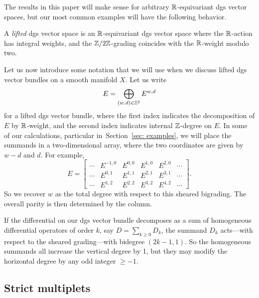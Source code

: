 \documentclass[pdftex]{sigma}
\numberwithin{equation}{section}
\begin{document}
The results in this paper will make sense for arbitrary $\mathbb R$-equivariant dgs vector spaces, but our most common examples will have the following behavior.

\begin{dfn}
	A \emph{lifted} dgs vector space is an $\mathbb R$-equivariant dgs vector space where the $\mathbb R$-action has integral weights, and the $\mathbb Z/2\mathbb Z$-grading coincides with the $\mathbb R$-weight modulo two.
\end{dfn}

Let us now introduce some notation that we will use when we discuss lifted dgs vector bundles on a smooth manifold $X$. Let us write
\begin{equation*}
E = \bigoplus_{(w,d) \in \mathbb Z^2} E^{w,d}
\end{equation*}
for a lifted dgs vector bundle, where the first index indicates the decomposition of $E$ by $\mathbb R$-weight, and the second index indicates internal $\mathbb Z$-degree on $E$. In some of our calculations, particular in~Section~\ref{sec: examples}, we will place the summands in a two-dimensional array, where the two coordinates are given by $w-d$ and $d$. For example,
\begin{equation*}
E =
\begin{bmatrix}
\cdots &E^{-1,0} &E^{0,0} &E^{1,0} &E^{2,0}&\cdots\\
\cdots &E^{0,1} &E^{1,1} &E^{2,1} &E^{3,1}&\cdots\\
\cdots &E^{1,2} &E^{2,2} &E^{3,2} &E^{4,2} &\cdots
\end{bmatrix}.
\end{equation*}
So we recover $w$ as the total degree with respect to this sheared bigrading. The overall parity is then determined by the column.

If the differential on our dgs vector bundle decomposes as a sum of homogeneous differential operators of order $k$, say $D = \sum_{k \ge 0} D_k$, the summand $D_k$ acts---with respect to the sheared grading---with bidegree $(2k-1, 1)$. So the homogeneous summands all increase the vertical degree by 1, but they may modify the horizontal degree by any odd integer $\ge -1$.

\subsection{Strict multiplets}
\end{document}
